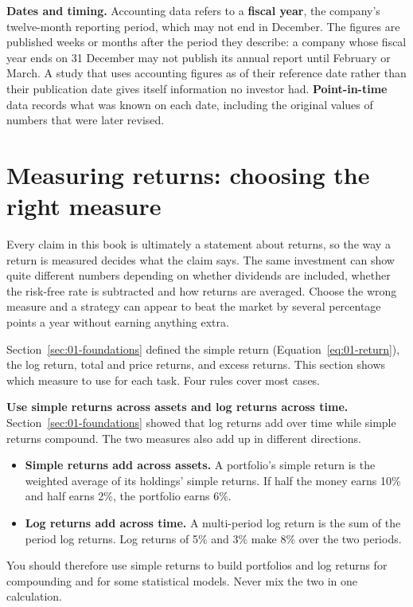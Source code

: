\textbf{Dates and timing.} Accounting data refers to a \textbf{fiscal year}, the company's twelve-month reporting period, which may not end in December. The figures are published weeks or months after the period they describe: a company whose fiscal year ends on 31 December may not publish its annual report until February or March. A study that uses accounting figures as of their reference date rather than their publication date gives itself information no investor had. \textbf{Point-in-time} data records what was known on each date, including the original values of numbers that were later revised.

\section{Measuring returns: choosing the right measure}
\label{sec:02-returns}

Every claim in this book is ultimately a statement about returns, so the way a
return is measured decides what the claim says. The same investment can show
quite different numbers depending on whether dividends are included, whether
the risk-free rate is subtracted and how returns are averaged. Choose the wrong
measure and a strategy can appear to beat the market by several percentage
points a year without earning anything extra.

Section~\ref{sec:01-foundations} defined the simple return
(Equation~\eqref{eq:01-return}), the log return, total and price returns, and
excess returns. This section shows which measure to use for each task. Four
rules cover most cases.

\textbf{Use simple returns across assets and log returns across time.}
Section~\ref{sec:01-foundations} showed that log returns add over time while
simple returns compound. The two measures also add up in different directions.

\begin{itemize}
  \item \textbf{Simple returns add across assets.} A portfolio's simple return is the weighted average of its holdings' simple returns. If half the money earns 10\% and half earns 2\%, the portfolio earns 6\%.
  \item \textbf{Log returns add across time.} A multi-period log return is the sum of the period log returns. Log returns of 5\% and 3\% make 8\% over the two periods.
\end{itemize}

You should therefore use simple returns to build portfolios and log returns for
compounding and for some statistical models. Never mix the two in one
calculation.

